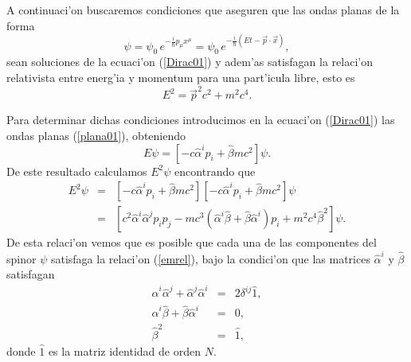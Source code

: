A continuaci'on buscaremos condiciones que aseguren que las ondas planas de la
forma
\begin{equation}\label{plana01}
\psi=\psi_0\, e^{-\frac{i}{\hbar}p_\mu x^\mu}=\psi_0\,
e^{-\frac{i}{\hbar}(Et-\vec{p}\cdot\vec{x})},
\end{equation} 
sean soluciones de la ecuaci'on (\ref{Dirac01}) y adem'as satisfagan la
relaci'on relativista entre energ'ia y momentum para una part'icula libre, esto
es
\begin{equation}\label{emrel}
E^2=\vec{p}^2c^2+m^2c^{4}.
\end{equation}

Para determinar dichas condiciones introducimos en la ecuaci'on (\ref{Dirac01})
las ondas planas (\ref{plana01}), obteniendo
\begin{equation}\label{Diracplana}
E\psi=\left[ -c\hat{\alpha}^i p_i+\hat{\beta}mc^2\right] \psi.
\end{equation}
De este resultado calculamos $E^2\psi$ encontrando que
\begin{eqnarray}\label{Diracplana}
E^2\psi&=&\left[ -c\hat{\alpha}^i p_i+\hat{\beta}mc^2\right]\left[
-c\hat{\alpha}^ip_i
+\hat{\beta}mc^2\right] \psi 
\nonumber\\
&=&\left[ c^2 \hat{\alpha}^i \hat{\alpha}^j p_i p_j -mc^3\left(\hat{\alpha}^i
\hat{\beta}+\hat{\beta}\hat{\alpha}^i \right)p_i+m^2c^4\hat{\beta}^2 \right]
\psi .
\end{eqnarray}
De esta relaci'on vemos que es posible que cada una de las componentes del
spinor $\psi$ satisfaga la relaci'on (\ref{emrel}), bajo la condici'on que
las matrices $\hat{\alpha}^i$ y $\hat\beta$ satisfagan
\begin{eqnarray}
\hat{\alpha}^i\hat{\alpha}^{j}+\hat{\alpha}^{j}\hat{\alpha}^i
&=&2\delta^{ij}\hat{1} , \label{alfalgebra1} \\
\hat{\alpha}^i\hat{\beta}+\hat{\beta}\hat{\alpha}^i &=&0,
\label{alfalgebra2} \\
\hat{\beta}^2 &=&\hat{1},
\label{alfalgebra3}
\end{eqnarray}
donde $\hat{1}$ es la matriz identidad de orden $N$.

